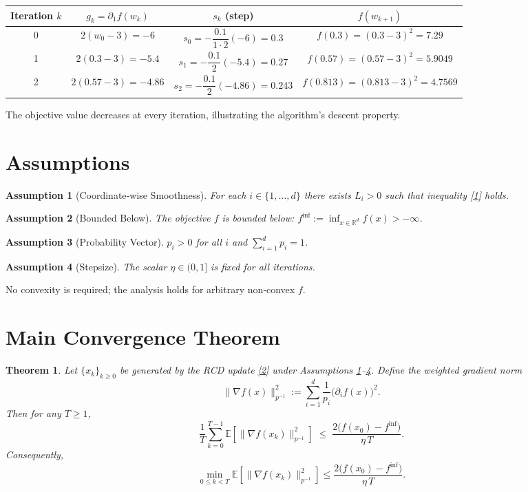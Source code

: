 \documentclass{article}
\newtheorem{theorem}{Theorem}
\newtheorem{assumption}{Assumption}
\newcommand{\E}{\mathbb{E}}
\newcommand{\R}{\mathbb{R}}
\begin{document}
\begin{tabular}{c|c|c|c}
Iteration $k$ & $g_k=\partial_1 f(w_k)$ & $s_k$ (step) & $f(w_{k+1})$ \\ \hline
0 & $2(w_0-3)=-6$ & $s_0=-\dfrac{0.1}{1\cdot 2}(-6)=0.3$ & $f(0.3)=(0.3-3)^2=7.29$ \\ 
1 & $2(0.3-3)=-5.4$ & $s_1=-\dfrac{0.1}{2}(-5.4)=0.27$ & $f(0.57)=(0.57-3)^2=5.9049$ \\ 
2 & $2(0.57-3)=-4.86$ & $s_2=-\dfrac{0.1}{2}(-4.86)=0.243$ & $f(0.813)=(0.813-3)^2=4.7569$ \\ 
\end{tabular}

The objective value decreases at every iteration, illustrating the algorithm’s descent property.

\newpage
\section*{Assumptions}
\begin{assumption}[Coordinate‑wise Smoothness]\label{as:smooth}
For each $i\in\{1,\dots ,d\}$ there exists $L_i>0$ such that inequality \eqref{1} holds.
\end{assumption}
\begin{assumption}[Bounded Below]\label{as:lower}
The objective $f$ is bounded below: $f^{\inf}:=\inf_{x\in\R^{d}}f(x)>-\infty$.
\end{assumption}
\begin{assumption}[Probability Vector]\label{as:prob}
$p_i>0$ for all $i$ and $\sum_{i=1}^{d}p_i=1$.
\end{assumption}
\begin{assumption}[Stepsize]\label{as:step}
The scalar $\eta\in(0,1]$ is fixed for all iterations.
\end{assumption}

No convexity is required; the analysis holds for arbitrary non‑convex $f$.

\section*{Main Convergence Theorem}
\begin{theorem}\label{thm:main}
Let $\{x_k\}_{k\ge0}$ be generated by the RCD update \eqref{2} under Assumptions \ref{as:smooth}–\ref{as:step}.
Define the weighted gradient norm
\[
\|\nabla f(x)\|_{p^{-1}}^{2}:=\sum_{i=1}^{d}\frac{1}{p_i}\big(\partial_i f(x)\big)^{2}.
\]
Then for any $T\ge1$,
\[
\frac{1}{T}\sum_{k=0}^{T-1}\E\!\left[\|\nabla f(x_k)\|_{p^{-1}}^{2}\right]
\;\le\;
\frac{2\big(f(x_0)-f^{\inf}\big)}{\eta\,T}.
\tag{3}
\]
Consequently,
\[
\min_{0\le k<T}\E\!\left[\|\nabla f(x_k)\|_{p^{-1}}^{2}\right]
\le\frac{2\big(f(x_0)-f^{\inf}\big)}{\eta\,T}.
\]
\end{theorem}
\end{document}
